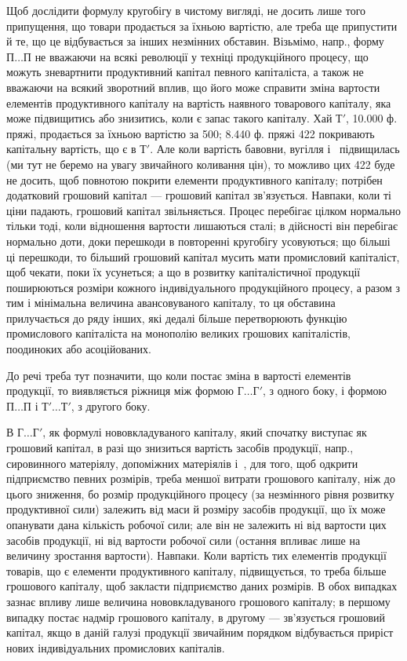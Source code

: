 Щоб дослідити формулу кругобігу в чистому вигляді, не досить лише
того припущення, що товари продається за їхньою вартістю, але треба
ще припустити й те, що це відбувається за інших незмінних обставин.
Візьмімо, напр., форму $П\dots{} П$ не вважаючи на всякі революції у техніці
продукційного процесу, що можуть зневартнити продуктивний капітал певного
капіталіста, а також не вважаючи на всякий зворотний вплив, що
його може справити зміна вартости елементів продуктивного капіталу на
вартість наявного товарового капіталу, яка може підвищитись або
знизитись, коли є запас такого капіталу. Хай $Т'$, \num{10.000} ф. пряжі,
продається за їхньою вартістю за 500; \num{8.440} ф. пряжі \deq{}
422 покривають капітальну вартість, що є в $Т'$. Але коли
вартість бавовни, вугілля і~ підвищилась (ми тут не беремо на увагу
звичайного коливання цін), то можливо цих 422 буде не досить,
щоб повнотою покрити елементи продуктивного капіталу; потрібен додатковий
грошовий капітал — грошовий капітал зв’язується. Навпаки, коли
ті ціни падають, грошовий капітал звільняється. Процес перебігає цілком
нормально тільки тоді, коли відношення вартости лишаються сталі; в дійсності
він перебігає нормально доти, доки перешкоди в повторенні кругобігу
усовуються; що більші ці перешкоди, то більший грошовий капітал
мусить мати промисловий капіталіст, щоб чекати, поки їх усунеться; а що в
розвитку капіталістичної продукції поширюються розміри кожного індивідуального
продукційного процесу, а разом з тим і мінімальна величина
авансовуваного капіталу, то ця обставина прилучається до ряду
інших, які дедалі більше перетворюють функцію промислового капіталіста
на монополію великих грошових капіталістів, поодиноких або
асоційованих.

До речі треба тут позначити, що коли постає зміна в вартості елементів
продукції, то виявляється ріжниця між формою $Г\dots{} Г'$, з одного
боку, і формою $П\dots{}П$ і $Т'\dots{}Т'$, з другого боку.

В $Г\dots{} Г'$, як формулі нововкладуваного капіталу, який спочатку
виступає як грошовий капітал, в разі що знизиться вартість засобів
продукції, напр., сировинного матеріялу, допоміжних матеріялів і~, для
того, щоб одкрити підприємство певних розмірів, треба меншої витрати
грошового капіталу, ніж до цього зниження, бо розмір продукційного
процесу (за незмінного рівня розвитку продуктивної сили) залежить від
маси й розміру засобів продукції, що їх може опанувати дана кількість
робочої сили; але він не залежить ні від вартости цих засобів продукції,
ні від вартости робочої сили (остання впливає лише на величину
зростання вартости). Навпаки. Коли вартість тих елементів продукції товарів,
що є елементи продуктивного капіталу, підвищується, то треба
більше грошового капіталу, щоб закласти підприємство даних розмірів.
В обох випадках зазнає впливу лише величина нововкладуваного грошового
капіталу; в першому випадку постає надмір грошового капіталу, в
другому — зв’язується грошовий капітал, якщо в даній галузі продукції
звичайним порядком відбувається приріст нових індивідуальних промислових
капіталів.

